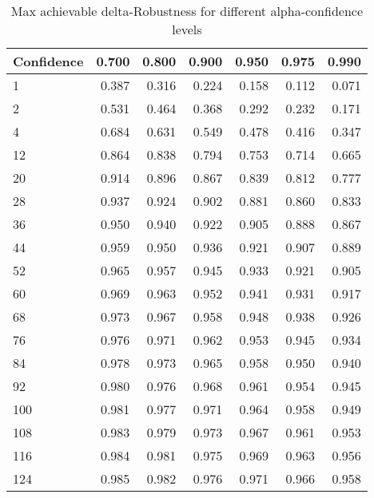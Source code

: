\begin{table}
\centering
\caption{Max achievable delta-Robustness for different alpha-confidence levels}
\label{tab:maxdelta}
\begin{tabular}{lrrrrrr}
\toprule
Confidence &  0.700 &  0.800 &  0.900 &  0.950 &  0.975 &  0.990 \\
\midrule
        1   &  0.387 &  0.316 &  0.224 &  0.158 &  0.112 &  0.071 \\
        2   &  0.531 &  0.464 &  0.368 &  0.292 &  0.232 &  0.171 \\
        4   &  0.684 &  0.631 &  0.549 &  0.478 &  0.416 &  0.347 \\
        12  &  0.864 &  0.838 &  0.794 &  0.753 &  0.714 &  0.665 \\
        20  &  0.914 &  0.896 &  0.867 &  0.839 &  0.812 &  0.777 \\
        28  &  0.937 &  0.924 &  0.902 &  0.881 &  0.860 &  0.833 \\
        36  &  0.950 &  0.940 &  0.922 &  0.905 &  0.888 &  0.867 \\
        44  &  0.959 &  0.950 &  0.936 &  0.921 &  0.907 &  0.889 \\
        52  &  0.965 &  0.957 &  0.945 &  0.933 &  0.921 &  0.905 \\
        60  &  0.969 &  0.963 &  0.952 &  0.941 &  0.931 &  0.917 \\
        68  &  0.973 &  0.967 &  0.958 &  0.948 &  0.938 &  0.926 \\
        76  &  0.976 &  0.971 &  0.962 &  0.953 &  0.945 &  0.934 \\
        84  &  0.978 &  0.973 &  0.965 &  0.958 &  0.950 &  0.940 \\
        92  &  0.980 &  0.976 &  0.968 &  0.961 &  0.954 &  0.945 \\
        100 &  0.981 &  0.977 &  0.971 &  0.964 &  0.958 &  0.949 \\
        108 &  0.983 &  0.979 &  0.973 &  0.967 &  0.961 &  0.953 \\
        116 &  0.984 &  0.981 &  0.975 &  0.969 &  0.963 &  0.956 \\
        124 &  0.985 &  0.982 &  0.976 &  0.971 &  0.966 &  0.958 \\
\bottomrule
\end{tabular}
\end{table}

